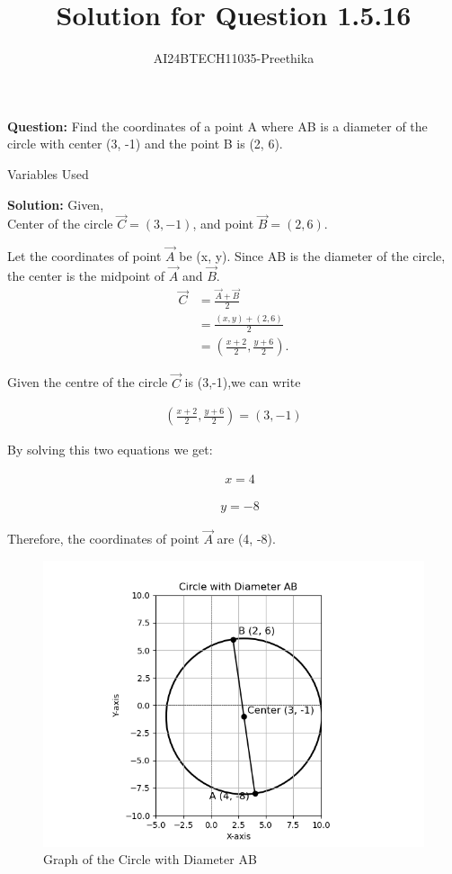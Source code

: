 \documentclass[journal,12pt,onecolumn]{IEEEtran}
\newcommand{\solution}{\textbf{Solution:}}
\begin{document}


\vspace{3cm}
\title{Solution for Question 1.5.16}
\author{AI24BTECH11035-Preethika}
\maketitle

\textbf{Question:} Find the coordinates of a point A where AB is a diameter of the circle with center (3, -1) and the point B is (2, 6).\\
	    
\begin{table}[h!]
	\centering
  
	\caption{Variables Used}
	\label{tab1.5.16}
\end{table}
    \solution 
    Given,\\
    Center of the circle $\vec{C} = (3, -1)$, and point $\vec{B} = (2, 6)$.
    
    Let the coordinates of point $\vec{A}$ be (x, y).  
    Since AB is the diameter of the circle, the center is the midpoint of $\vec{A}$ and $\vec{B}$.
	\begin{align}
		\vec{C} &= \frac{\vec{A}+\vec{B}}{2} \\
		  &=\frac{(x,y) +(2,6)}{2} \\
		  &=\left(\frac{x+2}{2},\frac{y+6}{2}\right).
	\end{align}	  
    
		Given the centre of the circle $\vec{C}$ is (3,-1),we can write
    
		\begin{align}
    \left( \frac{x + 2}{2}, \frac{y + 6}{2} \right) = (3, -1)
		\end{align}
    
    By solving this two equations we get:
    
		\begin{align}
    \quad x = 4
		\end{align}
    
		\begin{align}
    \quad y = -8
		\end{align}
    
    Therefore, the coordinates of point $\vec{A}$ are (4, -8).
    

\begin{figure}[ht]
   \centering
   \includegraphics[width=0.7\linewidth]{Figs/fig_1.png}
   \caption{Graph of the Circle with Diameter AB}
   \label{q16}
\end{figure}
\end{document}
